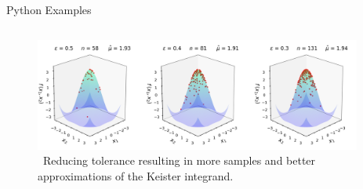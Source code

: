 \documentclass[final]{beamer}
\newlength{\onecolwid}
\newlength{\twocolwid}
\newlength{\threecolwid}
\begin{document}
\begin{frame}[t]
\begin{columns}[t]
\begin{column}{\threecolwid}
\begin{column}{\threecolwid}\vspace{-.8in}
\begin{block}{Python Examples}
    \begin{column}{\onecolwid}
        
    \end{column}
    \begin{column}{\twocolwid}
    \vspace{-2ex}
        \begin{figure}
            \includegraphics[width=0.96\textwidth]{Images/Three_3d_SurfaceScatters.png}
            \caption{\ Reducing tolerance resulting in more samples and better approximations of the Keister integrand.}
        \end{figure}
    \end{column}
\end{block}
\end{column}
\end{column}


\end{columns}
\end{frame}
\end{document}
